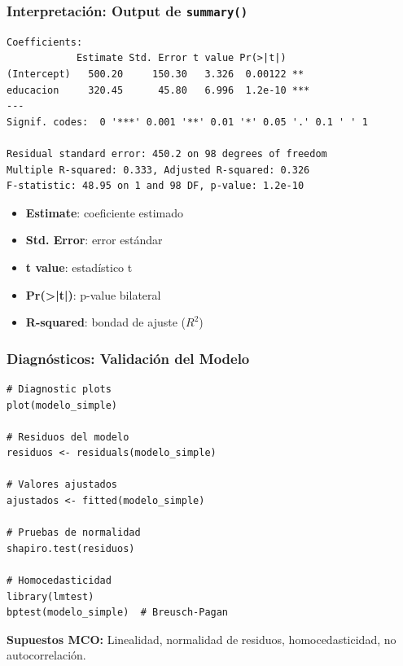 \documentclass[aspectratio=169,11pt]{beamer}
\begin{document}
\begin{frame}[fragile]
  \frametitle{Interpretación: Output de \texttt{summary()}}

  \tiny
  \begin{lstlisting}
Coefficients:
            Estimate Std. Error t value Pr(>|t|)
(Intercept)   500.20     150.30   3.326  0.00122 **
educacion     320.45      45.80   6.996  1.2e-10 ***
---
Signif. codes:  0 '***' 0.001 '**' 0.01 '*' 0.05 '.' 0.1 ' ' 1

Residual standard error: 450.2 on 98 degrees of freedom
Multiple R-squared: 0.333, Adjusted R-squared: 0.326
F-statistic: 48.95 on 1 and 98 DF, p-value: 1.2e-10
  \end{lstlisting}

  \small
  \begin{itemize}
    \item \textbf{Estimate}: coeficiente estimado
    \item \textbf{Std. Error}: error estándar
    \item \textbf{t value}: estadístico t
    \item \textbf{Pr(>|t|)}: p-value bilateral
    \item \textbf{R-squared}: bondad de ajuste ($R^2$)
  \end{itemize}
\end{frame}

\begin{frame}[fragile]
  \frametitle{Diagnósticos: Validación del Modelo}

  \begin{lstlisting}
# Diagnostic plots
plot(modelo_simple)

# Residuos del modelo
residuos <- residuals(modelo_simple)

# Valores ajustados
ajustados <- fitted(modelo_simple)

# Pruebas de normalidad
shapiro.test(residuos)

# Homocedasticidad
library(lmtest)
bptest(modelo_simple)  # Breusch-Pagan
  \end{lstlisting}

  \small
  \textbf{Supuestos MCO:} Linealidad, normalidad de residuos, homocedasticidad, no autocorrelación.
\end{frame}
\end{document}
